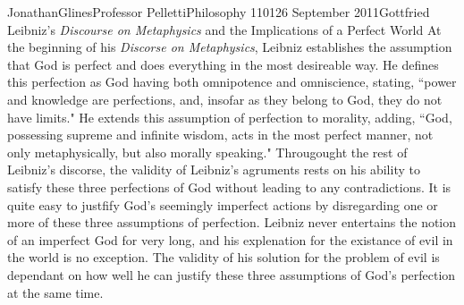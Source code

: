 \documentclass[12pt,letterpaper]{article}
\begin{document}
\begin{mla}{Jonathan}{Glines}{Professor Pelletti}{Philosophy 1101}{26 September 2011}{Gottfried Leibniz's \textit{Discourse on Metaphysics} and the Implications of a Perfect World}
At the beginning of his \textit{Discorse on Metaphysics}, Leibniz establishes the assumption that God is perfect and does everything in the most desireable way. He defines this perfection as God having both omnipotence and omniscience, stating, ``power and knowledge are perfections, and, insofar as they belong to God, they do not have limits." He extends this assumption of perfection to morality, adding, ``God, possessing supreme and infinite wisdom, acts in the most perfect manner, not only metaphysically, but also morally speaking." Througought the rest of Leibniz's discorse, the validity of Leibniz's agruments rests on his ability to satisfy these three perfections of God without leading to any contradictions. It is quite easy to justfify God's seemingly imperfect actions by disregarding one or more of these three assumptions of perfection. Leibniz never entertains the notion of an imperfect God for very long, and his explenation for the existance of evil in the world is no exception. The validity of his solution for the problem of evil is dependant on how well he can justify these three assumptions of God's perfection at the same time.




\end{mla}
\end{document}
